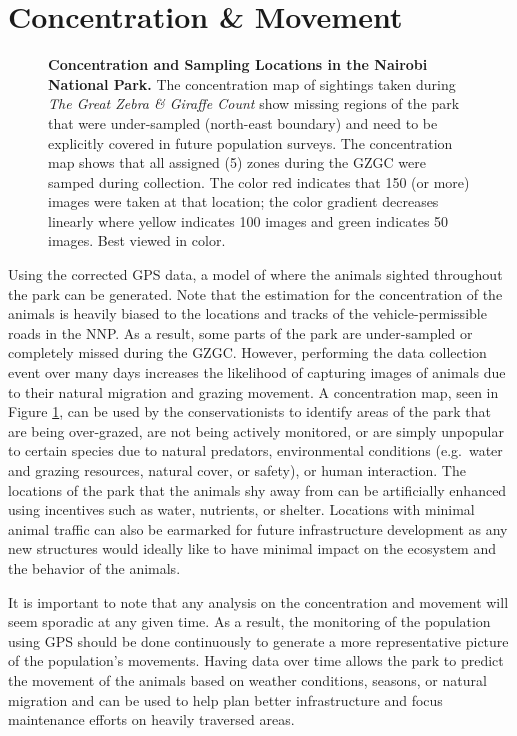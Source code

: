 \section{Concentration \& Movement}

\begin{figure}[!htb]%
	\centering
    	\caption[Concentration and Sampling Locations in the Nairobi National Park]{\textbf{Concentration and Sampling Locations in the Nairobi National Park.}  The concentration map of sightings taken during \textit{The Great Zebra \& Giraffe Count} show missing regions of the park that were under-sampled (north-east boundary) and need to be explicitly covered in future population surveys.  The concentration map shows that all assigned (5) zones during the GZGC were samped during collection.  The color red indicates that 150 (or more) images were taken at that location; the color gradient decreases linearly where yellow indicates 100 images and green indicates 50 images.  Best viewed in color.}
    	\label{fig:coverage}
\end{figure}

Using the corrected GPS data, a model of where the animals sighted throughout the park can be generated.  Note that the estimation for the concentration of the animals is heavily biased to the locations and tracks of the vehicle-permissible roads in the NNP.  As a result, some parts of the park are under-sampled or completely missed during the GZGC.  However, performing the data collection event over many days increases the likelihood of capturing images of animals due to their natural migration and grazing movement.  A concentration map, seen in Figure \ref{fig:coverage}, can be used by the conservationists to identify areas of the park that are being over-grazed, are not being actively monitored, or are simply unpopular to certain species due to natural predators, environmental conditions (e.g.\ water and grazing resources, natural cover, or safety), or human interaction.  The locations of the park that the animals shy away from can be artificially enhanced using incentives such as water, nutrients, or shelter.  Locations with minimal animal traffic can also be earmarked for future infrastructure development as any new structures would ideally like to have minimal impact on the ecosystem and the behavior of the animals.

It is important to note that any analysis on the concentration and movement will seem sporadic at any given time.  As a result, the monitoring of the population using GPS should be done continuously to generate a more representative picture of the population's movements.  Having data over time allows the park to predict the movement of the animals based on weather conditions, seasons, or natural migration and can be used to help plan better infrastructure and focus maintenance efforts on heavily traversed areas.
